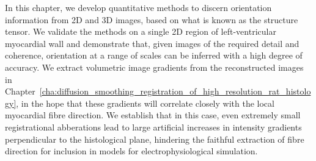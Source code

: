 
In this chapter, we develop quantitative methods to discern orientation information from 2D and 3D images, based on what is known as the structure tensor. We validate the methods on a single 2D region of left-ventricular myocardial wall and demonstrate that, given images of the required detail and coherence, orientation at a range of scales can be inferred with a high degree of accuracy. We extract volumetric image gradients from the reconstructed images in Chapter~\ref{cha:diffusion_smoothing_registration_of_high_resolution_rat_histology}, in the hope that these gradients will correlate closely with the local myocardial fibre direction. We establish that in this case, even extremely small registrational abberations lead to large artificial increases in intensity gradients perpendicular to the histological plane, hindering the faithful extraction of fibre direction for inclusion in models for electrophysiological simulation.
